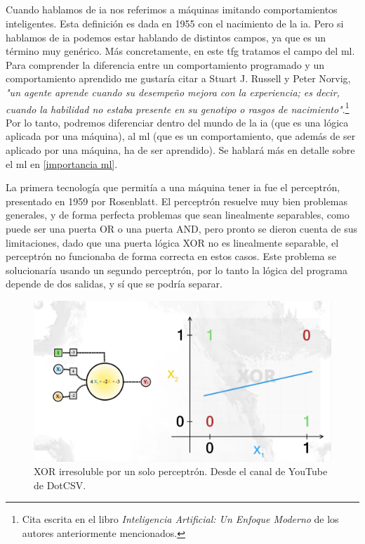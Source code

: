 \subsection{}
Cuando hablamos de \gls{ia} nos referimos a máquinas imitando comportamientos inteligentes. Esta definición es dada en 1955 con el nacimiento de la \gls{ia}. Pero si hablamos de \gls{ia} podemos estar hablando de distintos campos, ya que es un término muy genérico. Más concretamente, en este \gls{tfg} tratamos el campo del \gls{ml}.
\\
Para comprender la diferencia entre un comportamiento programado y un comportamiento aprendido me gustaría citar a Stuart J. Russell y Peter Norvig, \textit{"un agente aprende cuando su desempeño mejora con la experiencia; es decir, cuando la habilidad no estaba presente en su genotipo o rasgos de nacimiento"}.\footnote{Cita escrita en el libro \textit{Inteligencia Artificial: Un Enfoque Moderno} de los autores anteriormente mencionados.} Por lo tanto, podremos diferenciar dentro del mundo de la \gls{ia} (que es una lógica aplicada por una máquina), al \gls{ml} (que es un comportamiento, que además de ser aplicado por una máquina, ha de ser aprendido). Se hablará más en detalle sobre el \gls{ml} en \ref{importancia ml}.

La primera tecnología que permitía a una máquina tener \gls{ia} fue el perceptrón, presentado en 1959 por Rosenblatt. El perceptrón resuelve muy bien problemas generales, y de forma perfecta problemas que sean linealmente separables, como puede ser una puerta OR o una puerta AND, pero pronto se dieron cuenta de sus limitaciones, dado que una puerta lógica XOR no es linealmente separable, el perceptrón no funcionaba de forma correcta en estos casos. Este problema se solucionaría usando un segundo perceptrón, por lo tanto la lógica del programa depende de dos salidas, y sí que se podría separar.
\begin{figure}[h]
	\centering
	\includegraphics[width=15cm]{archivos/imagenes/problema-xor.png}
	\caption{XOR irresoluble por un solo perceptrón. Desde el canal de YouTube de DotCSV.}
	\label{XOR con un perceptron}
\end{figure}

